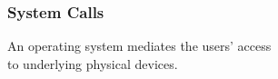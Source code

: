\begin{frame}

\frametitle{System Calls}

\vspace{\fill}

\begin{center}

An operating system mediates the users' access \\ to underlying physical
devices.

\end{center}

\vspace{\fill}

\end{frame}
